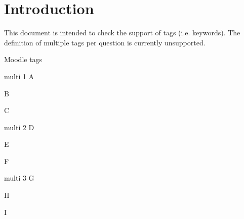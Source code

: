 \documentclass{article}
\begin{document}
\section*{Introduction}

This document is intended to check the support of tags (i.e. keywords). The 
definition of multiple tags per question is currently unsupported.

\begin{quiz}[points=1,tags={quizz-level}]{Moodle tags}

\begin{multi}[tags={question-level}]{multi 1}
A
\item B
\item* C
\end{multi}

\begin{multi}[tags={} %
						]{multi 2}
D
\item E
\item* F
\end{multi}

\begin{multi}[tags={éçö}]{multi 3}
G
\item H
\item* I
\end{multi}

\end{quiz}
\end{document}
